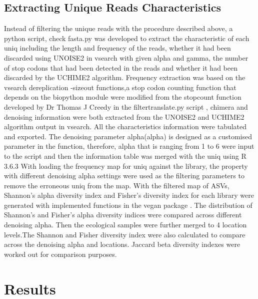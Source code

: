 \documentclass[11pt, a4paper]{article}
\begin{document}
\subsection{Extracting Unique Reads Characteristics}
Instead of filtering the unique reads with the procedure described above, a python script, check fasta.py was developed to extract the characteristic of each uniq including the length and frequency of the reads,  whether it had been discarded using UNOISE2 \cite{Edgar2016a} in vsearch \cite{vsearch} with given alpha and gamma, the number of stop codons that had been detected in the reads and whether it had been discarded by the UCHIME2 \cite{Edgar2016b} algorithm. Frequency extraction was based on the vsearch dereplication -sizeout functions,a stop codon counting function that depends  on the biopython \cite{Cock2009} module were modified from the stopcount function developed by Dr Thomas J Creedy in the filtertranslate.py script \cite{Andujar2020} , chimera and denoising information were both extracted from the UNOISE2 and UCHIME2 algorithm output in vsearch. All the characteristics information were tabulated and exported. The denoising parameter alpha(alpha) is designed as a customised  parameter in the function, therefore, alpha that is ranging from 1 to 6 were input to the script and then the information table was merged with the uniq using R 3.6.3\citet{R}
With loading the frequency map for uniq against the library, the property with different denoising alpha settings were used as the filtering parameters to remove the erroneous  uniq from the map. With the filtered map of ASVs, Shannon’s alpha diversity index and Fisher’s diversity index for each library were generated with implemented functions in the vegan package \cite{vegan}. The distribution of Shannon’s and Fisher’s alpha diversity indices were compared across different denoising alpha.
Then the ecological samples were further merged to 4 location levels.The Shannon and Fisher diversity index were also calculated to compare across the denoising  alpha and locations. Jaccard beta diversity indexes were worked out for comparison purposes.


\section{Results}
\end{document}

